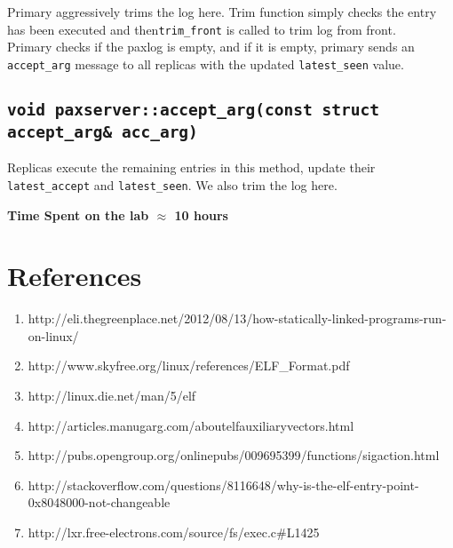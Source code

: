 \documentclass[10pt] {article}
\begin{document}
Primary aggressively trims the log here. Trim function simply checks the entry has been executed and then\texttt{trim\_front} is called to trim log from front. \\

Primary checks if the paxlog is empty, and if it is empty, primary sends an \texttt{accept\_arg} message to all replicas with the updated \texttt{latest\_seen} value.

\subsection {\texttt{void paxserver::accept\_arg(const struct accept\_arg\& acc\_arg)}}
Replicas execute the remaining entries in this method, update their \texttt{latest\_accept} and \texttt{latest\_seen}. We also trim the log here.


\noindent \textbf{Time Spent on the lab \ensuremath{\approx} 10 hours} 

\section{References}
\begin{enumerate}
  \item http://eli.thegreenplace.net/2012/08/13/how-statically-linked-programs-run-on-linux/
  \item http://www.skyfree.org/linux/references/ELF\_Format.pdf
  \item http://linux.die.net/man/5/elf
  \item http://articles.manugarg.com/aboutelfauxiliaryvectors.html
  \item  http://pubs.opengroup.org/onlinepubs/009695399/functions/sigaction.html
  \item http://stackoverflow.com/questions/8116648/why-is-the-elf-entry-point-0x8048000-not-changeable
  \item http://lxr.free-electrons.com/source/fs/exec.c\#L1425
\end{enumerate}
\end{document}
